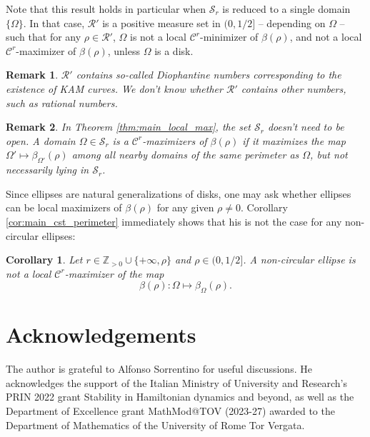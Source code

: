 \documentclass[a4paper]{article}
\newtheorem{corollary}{Corollary}
\newtheorem{remark}{Remark}
\theoremstyle{definition}
\def\Z{\mathbb{Z}}
\begin{document}
\noindent Note that this result holds in particular when $\mathscr S_r$ is reduced to a single domain $\{\Omega\}$. In that case, $\mathscr R'$ is a positive measure set in $(0,1/2]$ -- depending on $\Omega$ -- such that for any $\rho\in\mathscr R'$, $\Omega$ is not a local $\mathscr C^r$-minimizer of $\beta(\rho)$, and not a local $\mathscr C^r$-maximizer of $\beta(\rho)$, unless $\Omega$ is a disk.

\begin{remark}
    $\mathscr R'$ contains so-called Diophantine numbers corresponding to the existence of KAM curves. We don't know whether $\mathscr R'$ contains other numbers, such as rational numbers. 
\end{remark}

\begin{remark}
    In Theorem \ref{thm:main_local_max}, the set $\mathscr S_r$ doesn't need to be open. A domain $\Omega\in\mathscr S_r$ is a $\mathscr C^r$-maximizers of $\beta(\rho)$ if it maximizes the map $\Omega'\mapsto\beta_{\Omega'}(\rho)$ among all nearby domains of the same perimeter as $\Omega$, but not necessarily lying in $\mathscr S_r$.
\end{remark}

Since ellipses are natural generalizations of disks, one may ask whether ellipses can be local maximizers of $\beta(\rho)$ for any given $\rho\neq 0$. Corollary \ref{cor:main_cst_perimeter} immediately shows that his is not the case for any non-circular ellipses:

\begin{corollary}
    \label{cor:ell_non_loc_max}
    Let $r\in\Z_{>0}\cup\{+\infty,\rho\}$ and $\rho\in(0,1/2]$. A non-circular ellipse is not a local $\mathscr C^r$-maximizer of the map 
    \[
    \beta(\rho):\Omega\mapsto\beta_{\Omega}(\rho).
    \]
\end{corollary}



\section{Acknowledgements}
The author is grateful to Alfonso Sorrentino for useful discussions. 
He acknowledges the support of the Italian Ministry of University and Research's PRIN 2022 grant Stability in Hamiltonian dynamics and beyond, as well as the Department of Excellence grant MathMod@TOV (2023-27) awarded to the Department of Mathematics of the University of Rome Tor Vergata.
\end{document}

